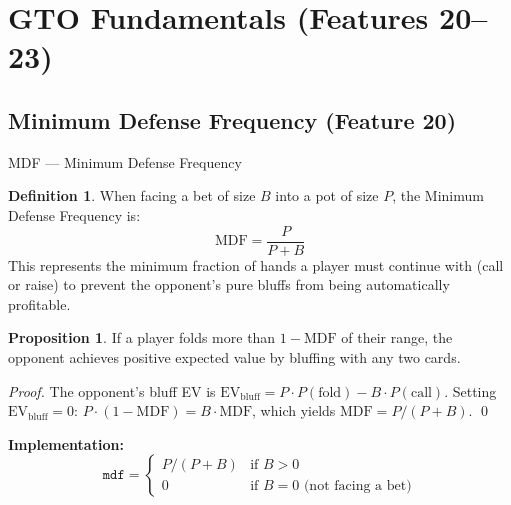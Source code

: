\documentclass[11pt, a4paper]{article}
\theoremstyle{definition}
\newtheorem{definition}{Definition}[section]
\newtheorem{proposition}{Proposition}[section]
\newcommand{\feature}[1]{\texttt{#1}}
\begin{document}
\section{GTO Fundamentals (Features 20--23)}

\subsection{Minimum Defense Frequency (Feature 20)}

\begin{featurebox}{MDF --- Minimum Defense Frequency}
\begin{definition}
When facing a bet of size $B$ into a pot of size $P$, the Minimum Defense Frequency is:
\begin{equation}
    \boxed{\text{MDF} = \frac{P}{P + B}}
\end{equation}
This represents the minimum fraction of hands a player must continue with (call or raise) to prevent the opponent's pure bluffs from being automatically profitable.
\end{definition}

\begin{proposition}
If a player folds more than $1 - \text{MDF}$ of their range, the opponent achieves positive expected value by bluffing with any two cards.
\end{proposition}
\begin{proof}
The opponent's bluff EV is $\text{EV}_{\text{bluff}} = P \cdot P(\text{fold}) - B \cdot P(\text{call})$. Setting $\text{EV}_{\text{bluff}} = 0$: $P \cdot (1 - \text{MDF}) = B \cdot \text{MDF}$, which yields $\text{MDF} = P / (P + B)$. \qed
\end{proof}

\textbf{Implementation:}
\begin{equation}
    \feature{mdf} = \begin{cases} P / (P + B) & \text{if } B > 0 \\ 0 & \text{if } B = 0 \text{ (not facing a bet)} \end{cases}
\end{equation}
\end{featurebox}
\end{document}
